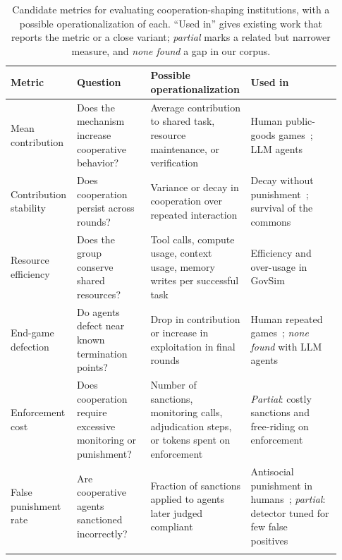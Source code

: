 \documentclass[runningheads]{llncs}
\newcommand{\rowline}{\arrayrulecolor{black!22}\specialrule{0.4pt}{2pt}{2pt}\arrayrulecolor{black}}
\begin{document}
\begin{table}[!htbp]
\centering
\caption{Candidate metrics for evaluating cooperation-shaping institutions, with a possible operationalization of each. ``Used in'' gives existing work that reports the metric or a close variant; \emph{partial} marks a related but narrower measure, and \emph{none found} a gap in our corpus.}
\label{tab:metrics}
\scriptsize
\renewcommand{\arraystretch}{1.05}
\setlength{\tabcolsep}{3.5pt}
\begin{tabular}{@{}>{\raggedright\arraybackslash}p{0.15\linewidth} >{\raggedright\arraybackslash}p{0.22\linewidth} >{\raggedright\arraybackslash}p{0.29\linewidth} >{\raggedright\arraybackslash}p{0.27\linewidth}@{}}
\toprule
\textbf{Metric} & \textbf{Question} & \textbf{Possible operationalization} & \textbf{Used in} \\
\midrule
Mean contribution & Does the mechanism increase cooperative behavior? & Average contribution to shared task, resource maintenance, or verification & Human public-goods games~\citep{fehr2000cooperation}; LLM agents~\citep{piedrahita2025corruptedreasoningreasoninglanguage,vallinder2024cultural} \\ \rowline
Contribution stability & Does cooperation persist across rounds? & Variance or decay in cooperation over repeated interaction & Decay without punishment~\citep{fehr2000cooperation}; survival of the commons~\citep{piatti2024govsim,gupta2026social,faulkner2026evaluatingcooperationllmsocial,rehm2026selfgovernance} \\ \rowline
Resource efficiency & Does the group conserve shared resources? & Tool calls, compute usage, context usage, memory writes per successful task & Efficiency and over-usage in GovSim~\citep{piatti2024govsim} \\ \rowline
End-game defection & Do agents defect near known termination points? & Drop in contribution or increase in exploitation in final rounds & Human repeated games~\citep{andreoni1988why}; \emph{none found} with LLM agents \\ \rowline
Enforcement cost & Does cooperation require excessive monitoring or punishment? & Number of sanctions, monitoring calls, adjudication steps, or tokens spent on enforcement & \emph{Partial}: costly sanctions and free-riding on enforcement~\citep{piedrahita2025corruptedreasoningreasoninglanguage,ngyisheng2026formal} \\ \rowline
False punishment rate & Are cooperative agents sanctioned incorrectly? & Fraction of sanctions applied to agents later judged compliant & Antisocial punishment in humans~\citep{herrmannAntisocialPunishmentSocieties2008}; \emph{partial}: detector tuned for few false positives~\citep{bracalesyrnikov2026institutionalai} \\ \rowline

\end{tabular}
\end{table}
\end{document}
